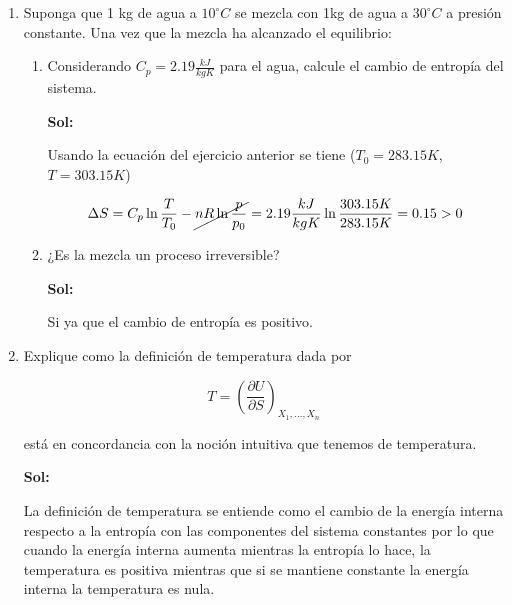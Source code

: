 \documentclass[12pt,a4paper]{article}
\begin{document}
\begin{enumerate}



\item Suponga que 1 kg de agua a $10^{\circ}C$ se mezcla con 1kg de agua a $30^{\circ}C$ a presión constante. Una vez que la mezcla ha alcanzado el equilibrio:

\begin{enumerate}
    \item Considerando $C_p = 2.19 \frac{kJ}{kg K}$ para el agua, calcule el cambio de entropía del sistema.
    
    \textbf{Sol:}
    
    Usando la ecuación del ejercicio anterior se tiene ($T_0 = 283.15 K$, $T = 303.15 K$)
    
    \begin{equation*}
        \Delta S = C_p \ln{\frac{T}{T_0}} - \cancel{nR \ln{\frac{p}{p_0}}} = 2.19 \frac{kJ}{kg K}\ln{\frac{303.15 K}{283.15 K}} = 0.15 > 0
    \end{equation*}
    
    \item ¿Es la mezcla un proceso irreversible?
    
    \textbf{Sol:}
    
    Si ya que el cambio de entropía es positivo.
    
\end{enumerate}






\item Explique como la definición de temperatura dada por 

\begin{equation*}
    T = \left(\frac{\partial U}{\partial S}\right)_{X_1,..., X_n}
\end{equation*}

está en concordancia con la noción intuitiva que tenemos de temperatura.

\textbf{Sol:}

La definición de temperatura se entiende como el cambio de la energía interna respecto a la entropía con las componentes del sistema constantes por lo que cuando la energía interna aumenta mientras la entropía lo hace, la temperatura es positiva mientras que si se mantiene constante la energía interna la temperatura es nula.
    
\end{enumerate}
\end{document}
